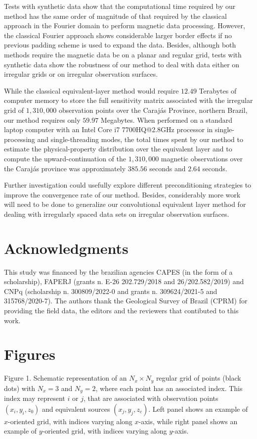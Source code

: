 \documentclass[manuscript,noblind]{geophysics}
\begin{document}
Tests with synthetic data show that the computational time required by our method has 
the same order of magnitude of that required by the classical approach in the Fourier domain
to perform magnetic data processing.
However, the classical Fourier approach shows considerable larger border effects if no previous 
padding scheme is used to expand the data. 
Besides, although both methods require the magnetic data be on a planar and regular grid, 
tests with synthetic data show the robustness of our method to deal with data either on irregular grids
or on irregular observation surfaces.

While the classical equivalent-layer method would require $12.49$ Terabytes of computer memory to store the full
sensitivity matrix associated with the irregular grid of $1,310,000$ observation points over the
Carajás Province, northern Brazil, our method requires only $59.97$ Megabytes.
When performed on a standard laptop computer with an Intel Core i7 7700HQ@2.8GHz processor in
single-processing and single-threading modes, the total times spent by our method to estimate the
physical-property distribution over the equivalent layer and to compute the upward-continuation
of the $1,310,000$ magnetic observations over the Carajás province was approximately $385.56$ 
seconds and $2.64$ seconds.

Further investigation could usefully explore different preconditioning strategies to improve the
convergence rate of our method. Besides, considerably more work will need to be done to generalize
our convolutional equivalent layer method for dealing with irregularly spaced data sets on 
irregular observation surfaces.

\section{Acknowledgments}
This study was financed by the brazilian agencies CAPES (in the form of a scholarship), FAPERJ
(grants n. E-26 202.729/2018 and 26/202.582/2019) and CNPq (scholarship n. 300809/2022-0 and grants n. 309624/2021-5 and 315768/2020-7). The authors thank the Geological Survey of Brazil (CPRM) for providing the field data, the editors and the reviewers that contibuted to this work.

\section{Figures}

{
	{Figure 1. Schematic representation of an $N_{x} \times N_{y}$ regular grid of points (black dots) with $N_{x} = 3$ and $N_{y} = 2$, where each point has an associated index. This index may represent $i$ or $j$, that are associated with observation points $(x_{i}, y_{i}, z_{0})$ and equivalent sources $(x_{j}, y_{j}, z_{c})$. Left panel shows an example of $x$-oriented grid, with indices varying along $x$-axis, while right panel shows an example of $y$-oriented grid, with indices varying along $y$-axis.}
	\label{fig:regular-grids}
}
\end{document}
